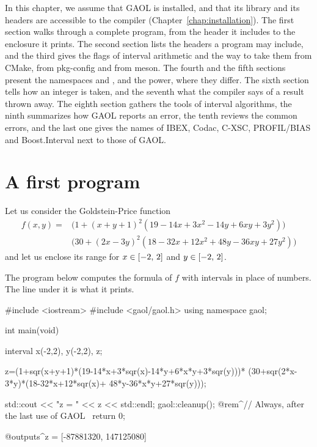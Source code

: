 \documentclass[12pt,a4paper,twoside,openright]{book}
\begin{document}
\medskip
In this chapter, we assume that GAOL is installed, and that its library and
its headers are accessible to the compiler (Chapter~\ref{chap:installation}).
The first section walks through a complete program, from the header it
includes to the enclosure it prints. The second section lists the headers a
program may include, and the third gives the flags of interval arithmetic and
the way to take them from CMake, from pkg-config and from meson. The fourth
and the fifth sections present the namespaces  and
, and the power, where they differ. The sixth section
tells how an integer is taken, and the seventh what the compiler says of a
result thrown away. The eighth section gathers the tools of interval
algorithms, the ninth summarizes how GAOL reports an error, the tenth reviews
the common errors, and the last one gives the names of IBEX, Codac, C-XSC,
PROFIL/BIAS and Boost.Interval next to those of GAOL.

\section{A first program}\label{sec:first-program}
%

Let us consider the Goldstein-Price function
\begin{align*}
f(x,y)=&\bigl(1+(x+y+1)^2(19-14x+3x^2-14y+6xy+3y^2)\bigr)\\
&\bigl(30+(2x-3y)^2(18-32x+12x^2+48y-36xy+27y^2)\bigr)
\end{align*}
and let us enclose its range for $x\in[-2,\,2]$ and $y\in[-2,\,2]$.

\begin{Ex}\label{ex:goldstein-price}
The program below computes the formula of $f$ with intervals in place of
numbers. The line under it is what it prints.
 \begin{example}
 #include <iostream>
 #include <gaol/gaol.h>
 using namespace gaol;

 int main(void)
 {
   interval
     x(-2,2),
     y(-2,2), z;

   z=(1+sqr(x+y+1)*(19-14*x+3*sqr(x)-14*y+6*x*y+3*sqr(y)))*
     (30+sqr(2*x-3*y)*(18-32*x+12*sqr(x)+
        48*y-36*x*y+27*sqr(y)));

   std::cout << "z = " << z << std::endl;
   gaol::cleanup(); @rem^// Always, after the last use of GAOL~
   return 0;
 }
 @outputs^z = [-87881320, 147125080]~
 \end{example}
\end{Ex}
\end{document}
